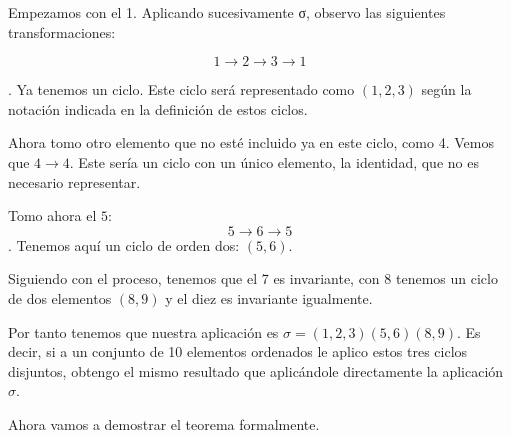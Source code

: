 \documentclass[nochap]{apuntes}
\begin{document}
 Empezamos con el 1. Aplicando sucesivamente σ, observo las siguientes transformaciones:
 
 \[ 1 \to 2 \to 3 \to 1 \]
 
 . Ya tenemos un ciclo. Este ciclo será representado como $(1,2,3)$ según la notación indicada en la definición de estos ciclos.
 
 Ahora tomo otro elemento que no esté incluido ya en este ciclo, como 4. Vemos que $4 \to 4$. Este sería un ciclo con un único elemento, la identidad, que no es necesario representar.
 
 Tomo ahora el $5$: \[5 \to  6 \to 5 \]. Tenemos aquí un ciclo de orden dos: $(5,6)$.
 
 Siguiendo con el proceso, tenemos que el 7 es invariante, con $8$ tenemos un ciclo de dos elementos $(8,9)$ y el diez es invariante igualmente.
 
 Por tanto tenemos que nuestra aplicación es $\sigma = (1,2,3)(5,6)(8,9)$. Es decir, si a un conjunto de 10 elementos ordenados le aplico estos tres ciclos disjuntos, obtengo el mismo resultado que aplicándole directamente la aplicación $\sigma$.

Ahora vamos a demostrar el teorema formalmente.
\end{document}
